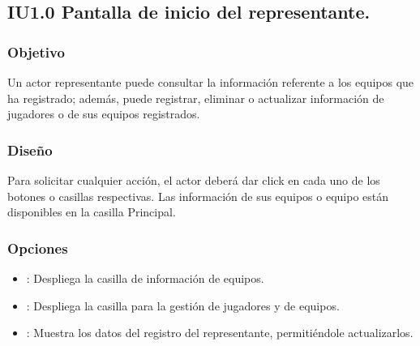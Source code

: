 
\subsection{IU1.0 Pantalla de inicio del representante.}

\subsubsection{Objetivo}
	Un actor representante puede consultar la información referente a los equipos que ha registrado; además, puede registrar, eliminar o actualizar información de jugadores o de sus equipos registrados.

\subsubsection{Diseño}
  Para solicitar cualquier acción, el actor deberá dar click en cada uno de los botones o casillas respectivas.
  Las información de sus equipos o equipo están disponibles en la casilla Principal.

\subsubsection{Opciones}
\begin{itemize}
	\item {}: Despliega la casilla de información de equipos.
  \item {}: Despliega la casilla para la gestión de jugadores y de equipos.
  \item {}: Muestra los datos del registro del representante, permitiéndole actualizarlos.
  
\end{itemize}
